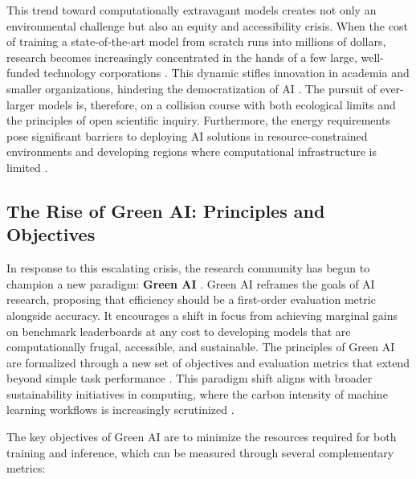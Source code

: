 \documentclass[12pt, a4paper]{article}
\begin{document}
This trend toward computationally extravagant models creates not only an environmental challenge but also an equity and accessibility crisis. When the cost of training a state-of-the-art model from scratch runs into millions of dollars, research becomes increasingly concentrated in the hands of a few large, well-funded technology corporations \cite{ahmed2022utility}. This dynamic stifles innovation in academia and smaller organizations, hindering the democratization of AI \cite{birhane2022values}. The pursuit of ever-larger models is, therefore, on a collision course with both ecological limits and the principles of open scientific inquiry. Furthermore, the energy requirements pose significant barriers to deploying AI solutions in resource-constrained environments and developing regions where computational infrastructure is limited \cite{hershcovich2022towards}.

\subsection{The Rise of Green AI: Principles and Objectives}
\label{ssec:green_ai_principles}

In response to this escalating crisis, the research community has begun to champion a new paradigm: \textbf{Green AI} \cite{schwartz2020green}. Green AI reframes the goals of AI research, proposing that efficiency should be a first-order evaluation metric alongside accuracy. It encourages a shift in focus from achieving marginal gains on benchmark leaderboards at any cost to developing models that are computationally frugal, accessible, and sustainable. The principles of Green AI are formalized through a new set of objectives and evaluation metrics that extend beyond simple task performance \cite{menghani2023efficient}. This paradigm shift aligns with broader sustainability initiatives in computing, where the carbon intensity of machine learning workflows is increasingly scrutinized \cite{verdecchia2023systematic}.

The key objectives of Green AI are to minimize the resources required for both training and inference, which can be measured through several complementary metrics:
\end{document}
